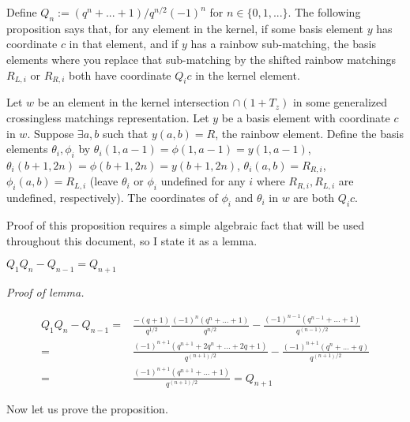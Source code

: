 \documentclass{amsart}
\begin{document}
Define $Q_n:=(q^n+...+1)/q^{n/2}(-1)^n$ for $n\in \{0,1,...\}$. The following proposition says that, for any element in the kernel, if some basis element $y$ has coordinate $c$ in that element, and if $y$ has a rainbow sub-matching, the basis elements where you replace that sub-matching by the shifted rainbow matchings $R_{L,i}$ or $R_{R,i}$ both have coordinate $Q_ic$ in the kernel element.

\begin{proposition}
	Let $w$ be an element in the kernel intersection $\cap (1+T_z)$ in some generalized crossingless matchings representation. Let $y$ be a basis element with coordinate $c$ in $w$. Suppose $\exists a,b$ such that $y(a,b)=R$, the rainbow element. Define the basis elements $\theta_i,\phi_i$ by $\theta_i(1,a-1)=\phi(1,a-1)=y(1,a-1)$, $\theta_i(b+1,2n)=\phi(b+1,2n)=y(b+1,2n)$, $\theta_i(a,b)=R_{R,i}$, $\phi_i(a,b)=R_{L,i}$ (leave $\theta_i$ or $\phi_i$ undefined for any $i$ where $R_{R,i},R_{L,i}$ are undefined, respectively). The coordinates of $\phi_i$ and $\theta_i$ in $w$ are both $Q_ic$.
	
	\label{shifted rainbow coeffs}
\end{proposition}

Proof of this proposition requires a simple algebraic fact that will be used throughout this document, so I state it as a lemma.

\begin{lemma}
	$Q_1Q_n-Q_{n-1}=Q_{n+1}$
	
	\label{Q alg}
\end{lemma}

\textit{Proof of lemma.}

\begin{align*}
Q_1Q_n-Q_{n-1}=&\frac{-(q+1)}{q^{1/2}}\frac{(-1)^n(q^n+...+1)}{q^{n/2}}-\frac{(-1)^{n-1}(q^{n-1}+...+1)}{q^{(n-1)/2}}\\
=&\frac{(-1)^{n+1}(q^{n+1}+2q^n+...+2q+1)}{q^{(n+1)/2}}-\frac{(-1)^{n+1}(q^n+...+q)}{q^{(n+1)/2}}\\
=&\frac{(-1)^{n+1}(q^{n+1}+...+1)}{q^{(n+1)/2}}=Q_{n+1}
\end{align*}

Now let us prove the proposition.
\end{document}
